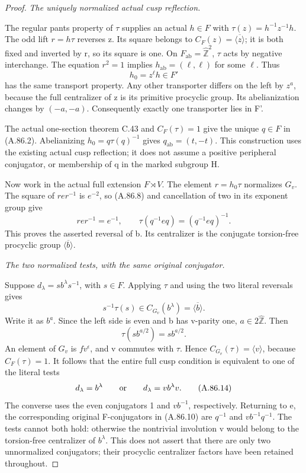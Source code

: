 \begin{proof}
\emph{The uniquely normalized actual cusp reflection.}\par
The regular pants property of \(\tau\) supplies an actual
\(h\in F\) with \(\tau(z)=h^{-1}z^{-1}h\).
The odd lift \(r=h\tau\) reverses z. Its square belongs to
\(C_F(z)=\overline{\langle z\rangle}\); it is both fixed
and inverted by r, so its square is one. On
\(F_{\mathrm{ab}}=\widehat{\mathbb Z}^2\), \(\tau\)
acts by negative interchange. The equation \(r^2=1\) implies
\(h_{\mathrm{ab}}=(\ell,\ell)\) for some \(\ell\).
Thus
\[
                         h_0=z^\ell h\in F'
 \tag{A.86.12}
\]
has the same transport property. Any other transporter differs on
the left by \(z^a\), because the full centralizer of z is its
primitive procyclic group. Its abelianization changes by
\((-a,-a)\). Consequently exactly one transporter lies in F'.

The actual one-section theorem C.43 and \(C_F(\tau)=1\)
give the unique \(q\in F\) in (A.86.2). Abelianizing
\(h_0=q\tau(q)^{-1}\) gives
\(q_{\mathrm{ab}}=(t,-t)\). This construction uses the
existing actual cusp reflection; it does not assume a positive
peripheral conjugator, or membership of q in the marked subgroup H.

Now work in the actual full extension \(F\rtimes V\).
The element \(r=h_0\tau\) normalizes \(G_v\).
The square of \(rer^{-1}\) is \(e^{-2}\), so (A.86.8)
and cancellation of two in its exponent group give
\[
       rer^{-1}=e^{-1},\qquad
       \tau(q^{-1}eq)=(q^{-1}eq)^{-1}.
 \tag{A.86.13}
\]
This proves the asserted reversal of b. Its centralizer is the
conjugate torsion-free procyclic group \(\overline{\langle b\rangle}\).

\emph{The two normalized tests, with the same original conjugator.}\par
Suppose \(d_\lambda=s b^\lambda s^{-1}\), with \(s\in F\).
Applying \(\tau\) and using the two literal reversals gives
\[
       s^{-1}\tau(s)\in C_{G_v}(b^\lambda)
                            =\overline{\langle b\rangle}.
\]
Write it as \(b^a\). Since the left side is even and b has
v-parity one, \(a\in2\widehat{\mathbb Z}\). Then
\[
                   \tau(sb^{a/2})=sb^{a/2}.
\]
An element of \(G_v\) is \(fv^\epsilon\), and v commutes
with \(\tau\). Hence \(C_{G_v}(\tau)=\langle v\rangle\),
because \(C_F(\tau)=1\). It follows that the entire full cusp
condition is equivalent to one of the literal tests
\[
       d_\lambda=b^\lambda
       \qquad\hbox{or}\qquad
       d_\lambda=v b^\lambda v.
 \tag{A.86.14}
\]
The converse uses the even conjugators 1 and \(vb^{-1}\),
respectively. Returning to e, the corresponding original F-conjugators
in (A.86.10) are \(q^{-1}\) and \(vb^{-1}q^{-1}\).
The tests cannot both hold: otherwise the nontrivial involution v
would belong to the torsion-free centralizer of \(b^\lambda\).
This does not assert that there are only two unnormalized conjugators;
their procyclic centralizer factors have been retained throughout.


\end{proof}
